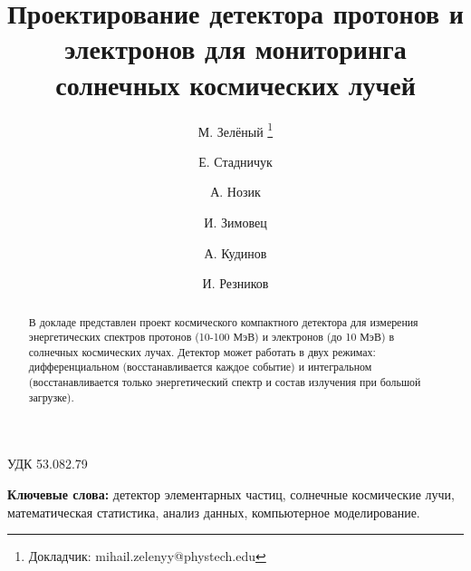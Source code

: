 \documentclass[12pt, a4paper, notitlepage, onecolumn]{article}
\begin{document}
\begin{flushright}
УДК {53.082.79}
\end{flushright}

\title{Проектирование детектора протонов и электронов для мониторинга солнечных космических лучей}
\author[1,2,3]{М. Зелёный%
  \thanks{Докладчик: mihail.zelenyy@phystech.edu}}
\author[1,2]{Е. Стадничук}
\author[1,2]{А. Нозик}
\author[3]{И. Зимовец}
\author[1]{А. Кудинов}
\author[1]{И. Резников}
%
%

\date{}
{\let\newpage\relax\maketitle}

\begin{abstract}
В докладе представлен проект космического компактного  детектора для измерения энергетических спектров протонов (10-100 МэВ) и электронов (до 10 МэВ) в солнечных космических лучах. Детектор может работать в двух режимах: дифференциальном (восстанавливается каждое событие) и интегральном (восстанавливается только энергетический спектр и состав излучения при большой загрузке).
\end{abstract}

{\noindent \bf Ключевые слова:} детектор элементарных частиц, солнечные космические лучи, математическая статистика, анализ данных, компьютерное моделирование. 
\end{document}
